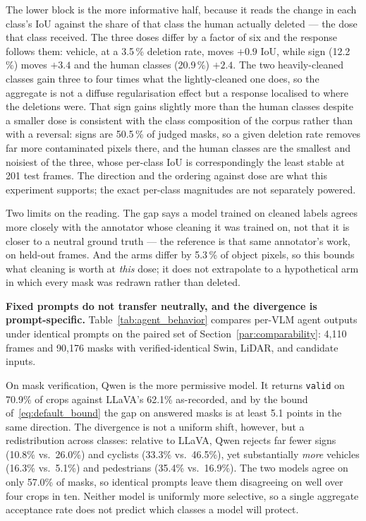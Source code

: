 \documentclass[conference]{IEEEtran}
\begin{document}
The lower block is the more informative half, because it reads the change in each class's IoU against
the share of that class the human actually deleted --- the dose that class received. The three doses
differ by a factor of six and the response follows them: vehicle, at a 3.5\,\% deletion rate, moves
$+0.9$ IoU, while sign (12.2\,\%) moves $+3.4$ and the human classes (20.9\,\%) $+2.4$. The two
heavily-cleaned classes gain three to four times what the lightly-cleaned one does, so the aggregate is
not a diffuse regularisation effect but a response localised to where the deletions were. That sign
gains slightly more than the human classes despite a smaller dose is consistent with the class
composition of the corpus rather than with a reversal: signs are 50.5\,\% of judged masks, so a given
deletion rate removes far more contaminated pixels there, and the human classes are the smallest and
noisiest of the three, whose per-class IoU is correspondingly the least stable at 201 test frames.
The direction and the ordering against dose are what this experiment supports; the exact per-class
magnitudes are not separately powered.

Two limits on the reading. The gap says a model trained on cleaned labels agrees more closely with the
annotator whose cleaning it was trained on, not that it is closer to a neutral ground truth --- the
reference is that same annotator's work, on held-out frames. And the arms differ by 5.3\,\% of object
pixels, so this bounds what cleaning is worth at \emph{this} dose; it does not extrapolate to a
hypothetical arm in which every mask was redrawn rather than deleted.



\textbf{Fixed prompts do not transfer neutrally, and the divergence is prompt-specific.}
Table~\ref{tab:agent_behavior} compares per-VLM agent outputs under identical prompts on the paired set of Section~\ref{par:comparability}: 4{,}110 frames and 90{,}176 masks with verified-identical Swin, LiDAR, and candidate inputs.

On mask verification, Qwen is the more permissive model.
It returns \texttt{valid} on 70.9\% of crops against LLaVA's 62.1\% as-recorded, and by the bound of~\eqref{eq:default_bound} the gap on answered masks is at least 5.1 points in the same direction.
The divergence is not a uniform shift, however, but a redistribution across classes: relative to LLaVA, Qwen rejects far fewer signs (10.8\% vs.\ 26.0\%) and cyclists (33.3\% vs.\ 46.5\%), yet substantially \emph{more} vehicles (16.3\% vs.\ 5.1\%) and pedestrians (35.4\% vs.\ 16.9\%).
The two models agree on only 57.0\% of masks, so identical prompts leave them disagreeing on well over four crops in ten.
Neither model is uniformly more selective, so a single aggregate acceptance rate does not predict which classes a model will protect.
\end{document}
